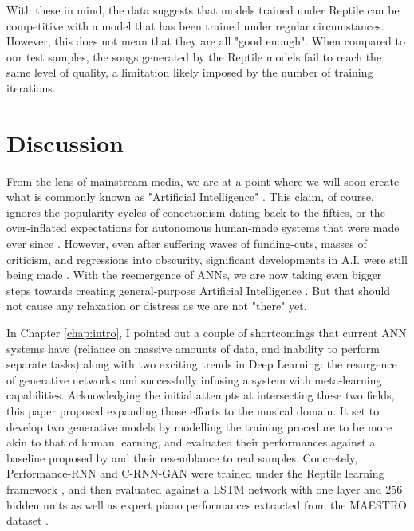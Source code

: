 \documentclass[a4paper]{book}
\begin{document}
With these in mind, the data suggests that models trained under Reptile can be competitive with a model that has been trained under regular circumstances. However, this does not mean that they are all "good enough". When compared to our test samples, the songs generated by the Reptile models fail to reach the same level of quality, a limitation likely imposed by the number of training iterations.

\chapter{Discussion}\label{chap:discussion}

From the lens of mainstream media, we are at a point where we will soon create what is commonly known as "Artificial Intelligence" \parencite{levy_ai_2010}. This claim, of course, ignores the popularity cycles of conectionism dating back to the fifties, or the over-inflated expectations for autonomous human-made systems that were made ever since \parencite{marcus_is_2012}. However, even after suffering waves of funding-cuts, masses of criticism, and regressions into obscurity, significant developments in A.I. were still being made \parencite{knight_ai_2016, minsky_perceptrons_1988}. With the reemergence of ANNs, we are now taking even bigger steps towards creating general-purpose Artificial Intelligence \parencite[e.g.,][]{vinyals_starcraft_2017}. But that should not cause any relaxation or distress as we are not "there" yet.

In Chapter \ref{chap:intro}, I pointed out a couple of shortcomings that current ANN systems have (reliance on massive amounts of data, and inability to perform separate tasks) along with two exciting trends in Deep Learning: the resurgence of generative networks and successfully infusing a system with meta-learning capabilities. Acknowledging the initial attempts at intersecting these two fields, this paper proposed expanding those efforts to the musical domain. It set to develop two generative models by modelling the training procedure to be more akin to that of human learning, and evaluated their performances against a baseline proposed by \textcite{larochelle_few-shot_2017} and their resemblance to real samples. Concretely, Performance-RNN \parencite{oore_this_2018} and C-RNN-GAN \parencite{mogren_c-rnn-gan_2016} were trained under the Reptile learning framework \parencite{nichol_first-order_2018}, and then evaluated against a LSTM network with one layer and 256 hidden units as well as expert piano performances extracted from the MAESTRO dataset \parencite{hawthorne_enabling_2018}.
\end{document}
